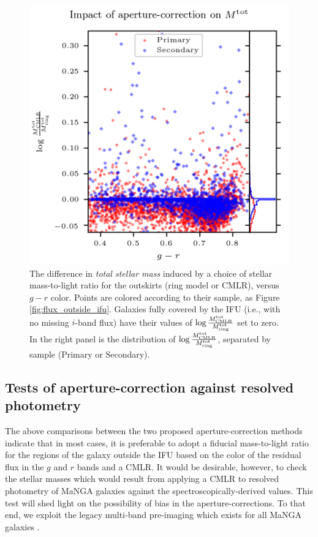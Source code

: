 \begin{figure}
    \centering
    \includegraphics[width=\columnwidth]{mtot_compare_cmlr_ring}
    \caption[The difference in total stellar mass induced by aperture-correction method]{\fixspacing The difference in \emph{total stellar mass} induced by a choice of stellar mass-to-light ratio for the outskirts (ring model or CMLR), versus $g-r$ color. Points are colored according to their sample, as Figure \ref{fig:flux_outside_ifu}. Galaxies fully covered by the IFU (i.e., with no missing $i$-band flux) have their values of $\log \frac{M^{\rm tot}_{\rm CMLR}}{M^{\rm tot}_{\rm ring}}$ set to zero. In the right panel is the distribution of $\log \frac{M^{\rm tot}_{\rm CMLR}}{M^{\rm tot}_{\rm ring}}$, separated by sample (Primary or Secondary).}
    \label{fig:mtot_compare_cmlr_ring}
\end{figure}

\subsection{Tests of aperture-correction against resolved photometry}
\label{chap2:subsec:aper_photometry}
The above comparisons between the two proposed aperture-correction methods indicate that in most cases, it is preferable to adopt a fiducial mass-to-light ratio for the regions of the galaxy outside the IFU based on the color of the residual flux in the $g$ and $r$ bands and a CMLR. It would be desirable, however, to check the stellar masses which would result from applying a CMLR to resolved photometry of MaNGA galaxies against the spectroscopically-derived values. This test will shed light on the possibility of bias in the aperture-corrections. To that end, we exploit the legacy multi-band pre-imaging which exists for all MaNGA galaxies \citep{sdss_summary}.

